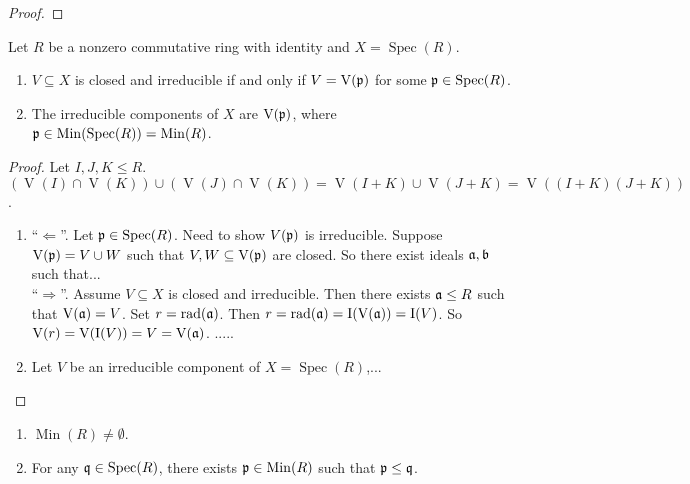 \begin{proof}

\end{proof}

\begin{proposition}
    Let $R$ be a nonzero commutative ring with identity and $X = \operatorname{Spec}(R)$.
    \begin{enumerate}
        \item $V \subseteq X$ is closed and irreducible if and only if $V = \operatorname{V}(\mathfrak{p})$ for some $\mathfrak{p} \in \operatorname{Spec}(R)$.
        \item The irreducible components of $X$ are $\operatorname{V}(\mathfrak{p})$, where $\mathfrak{p} \in \operatorname{Min}(\operatorname{Spec}(R)) = \operatorname{Min}(R)$.
    \end{enumerate}
\end{proposition}

\begin{proof}
    Let $I,J,K \leq R$. $(\operatorname{V}(I) \cap \operatorname{V}(K)) \cup (\operatorname{V}(J) \cap \operatorname{V}(K)) = \operatorname{V}(I+K) \cup \operatorname{V}(J+K) = \operatorname{V}((I+K)(J+K))$.
    \begin{enumerate}
        \item ``$\Leftarrow$''. Let $\mathfrak{p} \in \operatorname{Spec}(R)$. Need to show $V(\mathfrak{p})$ is irreducible. Suppose $\operatorname{V}(\mathfrak{p}) = V \cup W$ such that $V,W \subseteq \operatorname{V}(\mathfrak{p})$ are closed. So there exist ideals $\mathfrak{a},\mathfrak{b}$ such that... \\
            ``$\Rightarrow$''. Assume $V \subseteq X$ is closed and irreducible. Then there exists $\mathfrak{a} \leq R$ such that $\operatorname{V}(\mathfrak{a}) = V$. Set $r = \operatorname{rad}(\mathfrak{a})$. Then $r = \operatorname{rad}(\mathfrak{a}) = \operatorname{I}(\operatorname{V}(\mathfrak{a})) = \operatorname{I}(V)$. So $\operatorname{V}(r) = \operatorname{V}(\operatorname{I}(V)) = V = \operatorname{V}(\mathfrak{a})$. .....
        \item Let $V$ be an irreducible component of $X = \operatorname{Spec}(R)$,...
    \end{enumerate}
\end{proof}

\begin{corollary}
    \begin{enumerate}
        \item $\operatorname{Min}(R) \neq \emptyset$.
        \item For any $\mathfrak{q} \in \operatorname{Spec}(R)$, there exists $\mathfrak{p} \in \operatorname{Min}(R)$ such that $\mathfrak{p} \leq \mathfrak{q}$.
    \end{enumerate}
\end{corollary}

